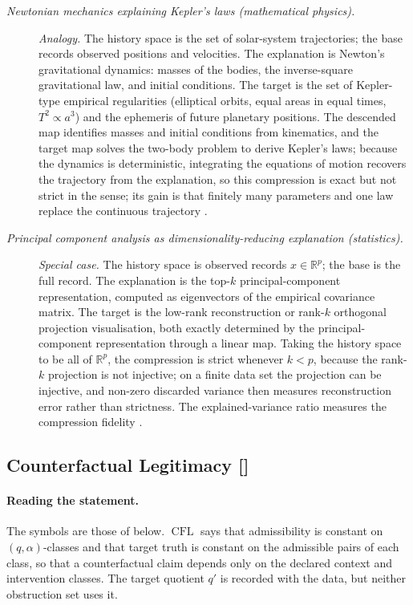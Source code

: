 \begingroup\small
\begin{description}
\item[\emph{Newtonian mechanics explaining
Kepler's laws (mathematical physics).}] \textit{Analogy.}
The history space is the set of solar-system
trajectories; the base records observed positions and
velocities.  The explanation is Newton's gravitational
dynamics: masses of the bodies, the inverse-square
gravitational law, and initial conditions.  The target
is the set of Kepler-type empirical regularities
(elliptical orbits, equal areas in equal times,
\(T^2\propto a^3\)) and the ephemeris of future
planetary positions.  The descended map identifies
masses and initial conditions from kinematics, and
the target map solves the two-body problem to derive
Kepler's laws; because the dynamics is deterministic,
integrating the equations of motion recovers the trajectory from the
explanation, so this compression is exact but not strict in the
 sense; its gain is that finitely many parameters and one
law replace the continuous trajectory \citep{Newton1687Principia}.

\item[\emph{Principal component analysis as
dimensionality-reducing explanation (statistics).}] \textit{Special case.}
The history space is observed records
\(x\in\mathbb R^p\); the base is the full record.
The explanation is the top-\(k\) principal-component
representation, computed as eigenvectors of the
empirical covariance matrix.  The target is the
low-rank reconstruction or rank-\(k\) orthogonal
projection visualisation, both exactly determined by
the principal-component representation through a
linear map.  Taking the history space to be all of
\(\mathbb R^p\), the compression is strict whenever \(k<p\), because
the rank-\(k\) projection is not injective; on a finite data set the
projection can be injective, and non-zero discarded variance then
measures reconstruction error rather than strictness.  The
explained-variance ratio measures the compression fidelity \citep{Pearson1901PCA}.

\end{description}
\endgroup


\subsection{Counterfactual Legitimacy [\texorpdfstring{}{F31}]}\label{sec:status-records-coherence:counterfactual}

\paragraph{Reading the statement.} The symbols are those of  below.
\(\operatorname{CFL}\) says that admissibility is constant on
\((q,\alpha)\)-classes and that target truth is constant on the
admissible pairs of each class, so that a counterfactual claim depends
only on the declared context and intervention classes. The target
quotient \(q'\) is recorded with the data, but
neither obstruction set uses it.

